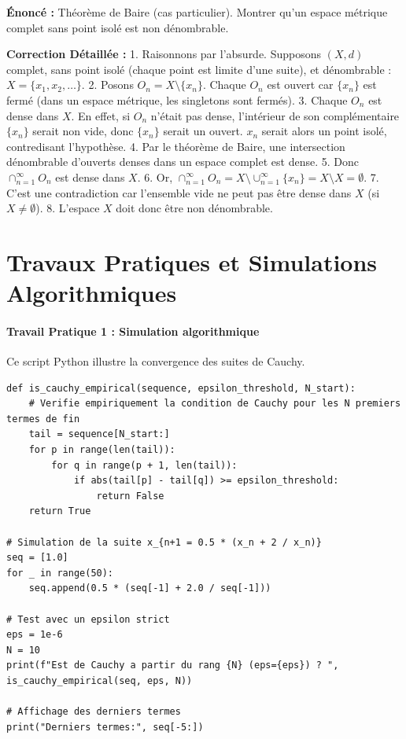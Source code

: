 \documentclass[11pt,a4paper]{article}
\begin{document}
\textbf{Énoncé :}
Théorème de Baire (cas particulier). Montrer qu'un espace métrique complet sans point isolé est non dénombrable.

\textbf{Correction Détaillée :}
1. Raisonnons par l'absurde. Supposons $(X, d)$ complet, sans point isolé (chaque point est limite d'une suite), et dénombrable : $X = \{x_1, x_2, \ldots\}$.
2. Posons $O_n = X \setminus \{x_n\}$. Chaque $O_n$ est ouvert car $\{x_n\}$ est fermé (dans un espace métrique, les singletons sont fermés).
3. Chaque $O_n$ est dense dans $X$. En effet, si $O_n$ n'était pas dense, l'intérieur de son complémentaire $\{x_n\}$ serait non vide, donc $\{x_n\}$ serait un ouvert. $x_n$ serait alors un point isolé, contredisant l'hypothèse.
4. Par le théorème de Baire, une intersection dénombrable d'ouverts denses dans un espace complet est dense.
5. Donc $\cap_{n=1}^\infty O_n$ est dense dans $X$.
6. Or, $\cap_{n=1}^\infty O_n = X \setminus \cup_{n=1}^\infty \{x_n\} = X \setminus X = \emptyset$.
7. C'est une contradiction car l'ensemble vide ne peut pas être dense dans $X$ (si $X \neq \emptyset$).
8. L'espace $X$ doit donc être non dénombrable.




\newpage
\part{Travaux Pratiques et Simulations Algorithmiques}
\subsection*{Travail Pratique 1 : Simulation algorithmique}

Ce script Python illustre la convergence des suites de Cauchy.

\begin{lstlisting}
def is_cauchy_empirical(sequence, epsilon_threshold, N_start):
    # Verifie empiriquement la condition de Cauchy pour les N premiers termes de fin
    tail = sequence[N_start:]
    for p in range(len(tail)):
        for q in range(p + 1, len(tail)):
            if abs(tail[p] - tail[q]) >= epsilon_threshold:
                return False
    return True

# Simulation de la suite x_{n+1 = 0.5 * (x_n + 2 / x_n)}
seq = [1.0]
for _ in range(50):
    seq.append(0.5 * (seq[-1] + 2.0 / seq[-1]))

# Test avec un epsilon strict
eps = 1e-6
N = 10
print(f"Est de Cauchy a partir du rang {N} (eps={eps}) ? ", is_cauchy_empirical(seq, eps, N))

# Affichage des derniers termes
print("Derniers termes:", seq[-5:])
\end{lstlisting}
\end{document}
